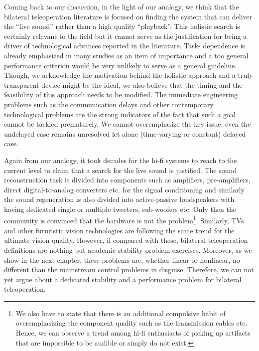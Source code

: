 Coming back to our discussion, in the light of our analogy, we think that the bilateral teleoperation literature is focused on finding
the system that can deliver the \enquote{live sound} rather than a high quality \enquote{playback}. This holistic search is certainly
relevant to the field but it cannot serve as the justification for being a driver of technological advances reported in the literature. Task-%
dependence is already emphasized in many studies as an item of importance and a too general performance criterion would be very unlikely
to serve as a general guideline. Though, we acknowledge the motivation behind the holistic approach and a truly transparent device 
might be the ideal, we also believe that the timing and the feasibility of this approach needs to be modified. The immediate engineering 
problems such as the communication delays and other contemporary technological problems are the strong indicators of the fact that such 
a goal cannot be tackled prematurely. We cannot overemphasize the key issue; even the undelayed case remains unresolved let alone 
(time-varying or constant) delayed case. 


Again from our analogy, it took decades for the hi-fi systems to reach to the current level to claim that
a search for the live sound is justified. The sound reconstruction task is divided into components such as amplifiers, pre-amplifiers, 
direct digital-to-analog converters etc. for the signal conditioning and similarly the sound regeneration is also divided into active-passive 
loudspeakers with having dedicated single or multiple tweeters, sub-woofers etc. Only then the community is convinced that the hardware 
is not the problem\footnote{We also have to state that there is an additional compulsive habit of overemphasizing the component quality such as the transmission cables etc. 
Hence, we can observe a trend among hi-fi enthusiasts of picking up artifacts that are impossible to be audible or simply do not exist.}.
Similarly, TVs and other futuristic vision technologies are following the same trend for the ultimate vision quality. However, if compared 
with these, bilateral teleoperation definitions are nothing but academic stability problem exercises. Moreover, as we show in the next
chapter, these problems are, whether linear or nonlinear, no different than the mainstream control problems in disguise. Therefore, we
can not yet argue about a dedicated stability and a performance problem for bilateral teleoperation. 


